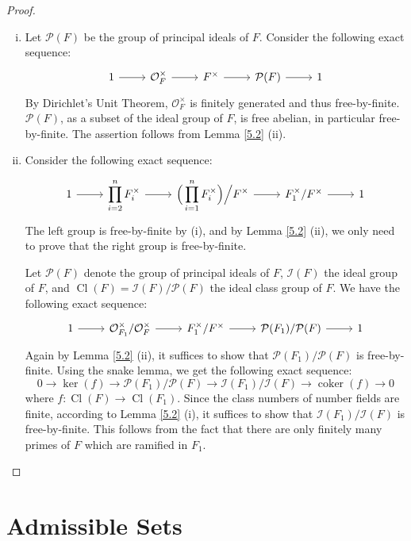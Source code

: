 \begin{proof}
\begin{enumerate}[(i)]
\item Let $\mathcal{P}(F)$ be the group of principal ideals of $F$. Consider the following exact sequence:
\[ \begin{tikzcd}
1 \ar[r] & \mathcal{O}_F^\times \ar[r] & F^\times \ar[r]& \mathcal{P}(F) \ar[r] & 1
\end{tikzcd} \]
By Dirichlet's Unit Theorem, $\mathcal{O}_F^\times$ is finitely generated and thus free-by-finite. $\mathcal{P}(F)$, as a subset of the ideal group of $F$, is free abelian, in particular free-by-finite. The assertion follows from Lemma \ref{5.2} (ii).
\item Consider the following exact sequence:
\[ \begin{tikzcd}
1 \ar[r] & \displaystyle \prod_{i=2}^{n} F_i^\times \ar[r]& \displaystyle \Big(\prod_{i=1}^{n}F_i^\times\Big)\Big/F^\times \ar[r]& F_1^\times/F^\times \ar[r]& 1
\end{tikzcd} \]
The left group is free-by-finite by (i), and by Lemma \ref{5.2} (ii), we only need to prove that the right group is free-by-finite.

Let $\mathcal{P}(F)$ denote the group of principal ideals of $F$, $\mathcal{I}(F)$ the ideal group of $F$, and $\operatorname{Cl}(F) = \mathcal{I}(F)/\mathcal{P}(F)$ the ideal class group of $F$. We have the following exact sequence:
\[ \begin{tikzcd}
1 \ar[r]& \mathcal{O}_{F_1}^\times /\mathcal{O}_F^\times\ar[r] & F_1^\times / F^\times\ar[r] & \mathcal{P}(F_1)/\mathcal{P}(F)\ar[r] & 1
\end{tikzcd} \]
Again by Lemma \ref{5.2} (ii), it suffices to show that $\mathcal{P}(F_1)/\mathcal{P}(F)$ is free-by-finite. Using the snake lemma, we get the following exact sequence:
\[
0 \longrightarrow \ker(f)\longrightarrow \mathcal{P}(F_1)/\mathcal{P}(F)\longrightarrow \mathcal{I}(F_1)/\mathcal{I}(F)
\longrightarrow \operatorname{coker}(f)\longrightarrow 0 \]
where $f:\operatorname{Cl}(F)\to \operatorname{Cl}(F_1)$. Since the class numbers of number fields are finite, according to Lemma \ref{5.2} (i), it suffices to show that $\mathcal{I}(F_1)/\mathcal{I}(F)$ is free-by-finite. This follows from the fact that there are only finitely many primes of $F$ which are ramified in $F_1$.\qedhere
\end{enumerate}
\end{proof}

\section{Admissible Sets}

